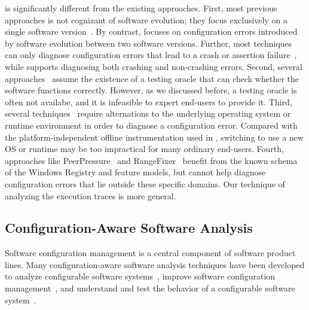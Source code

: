 \ourtool is significantly different from the existing approaches.
First, most previous approaches is not cognizant of software evolution;
they focus exclusively on a single software
version~\cite{Attariyan:2008:UCD, Whitaker:2004:CDS, 
Attariyan:2010:ACT, Rabkin:2011:PPC}. By contrast, \ourtool focuses
on configuration errors introduced by software evolution between
two software versions. Further, most techniques
can only diagnose configuration errors that lead to a crash or
assertion failure~\cite{Attariyan:2008:UCD, Whitaker:2004:CDS, 
Attariyan:2010:ACT, Rabkin:2011:PPC}, while \ourtool supports diagnosing both
crashing and non-crashing errors.
Second, several approaches~\cite{Attariyan:2010:ACT, Whitaker:2004:CDS}
assume the existence of a testing oracle that can 
check whether the software functions correctly. However, as we discussed
before, a testing oracle is often not availabe, and it
is infeasible to expert end-users to provide it.
Third, several techniques~\cite{Whitaker:2004:CDS, Su:2007:AIC} require alternations
to the underlying operating system or runtime environment
in order to diagnose a configuration error. Compared with
the platform-independent offline instrumentation used
in \ourtool, switching to use a new OS or runtime may be
too impractical for many ordinary end-users.
Fourth, approaches like
PeerPressure~\cite{Wang:2004:AMT} and RangeFixer~\cite{rangefix}
benefit from the known schema of the Windows Registry and
feature models, but cannot help diagnose configuration errors
that lie outside these specific domains. Our technique
of analyzing the execution traces is more general.


\subsection{Configuration-Aware Software Analysis}

Software configuration management is a central component
of software product lines.
Many configuration-aware software analysis techniques
have been developed to analyze configurable software
systems~\cite{Bodden:2013:SLS, Kang:2005:FRL, Mende:2008:SGM,
Kruger:2005:SAE}, improve software configuration
management~\cite{Garvin:2011, Rabiser:2012:QSU, Cooray:2010:RRD,
Barreiros:2009:MRC, TerBeek:2011:GCE}, and understand and test
the behavior of a configurable software
system~\cite{Qu:2008:CRT, SPLAT, Apel:2009:FLA, Shang:2013:ADB,
Staats:2011:PTO}.

